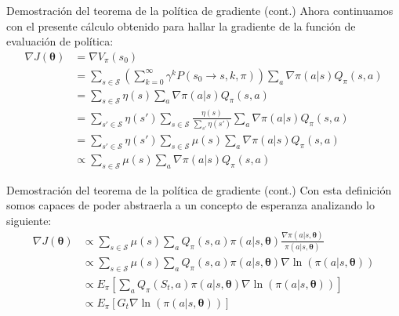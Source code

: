 \documentclass[10pt]{beamer}
\begin{document}
		\begin{frame}{Demostración del teorema de la política de gradiente (cont.)}
			Ahora continuamos con el presente cálculo obtenido para hallar la gradiente de la función de evaluación de política:
			\[
			\begin{aligned}
				\nabla J (\boldsymbol{\theta}) &= \nabla V_\pi(s_0) \\
				&= \sum_{s \in \mathcal{S}} \left(\sum_{k=0}^\infty \gamma^k P(s_0 \rightarrow s, k, \pi)\right) \sum_{a} \nabla \pi(a | s) Q_\pi (s, a) \\
				&= \sum_{s \in \mathcal{S}} \eta(s) \sum_a \nabla \pi(a | s) Q_\pi(s, a) \\
				&= \sum_{s' \in \mathcal{S}} \eta(s') \sum_{s \in \mathcal{S}} \frac{\eta(s)}{\sum_{s'}\eta(s')} \sum_a \nabla \pi(a | s) Q_\pi(s, a) \\
				&= \sum_{s' \in \mathcal{S}} \eta(s') \sum_{s \in \mathcal{S}} \mu(s) \sum_a \nabla \pi(a | s) Q_\pi(s, a) \\
				&\propto \sum_{s \in \mathcal{S}} \mu(s) \sum_a \nabla \pi(a | s) Q_\pi(s, a) 
			\end{aligned}
			\]
		\end{frame}

		\begin{frame}{Demostración del teorema de la política de gradiente (cont.)}
			Con esta definición somos capaces de poder abstraerla a un concepto de esperanza analizando lo siguiente:
			\[
			\begin{aligned}
				\nabla J(\boldsymbol{\theta}) &\propto \sum_{s \in \mathcal{S}} \mu(s) \sum_a Q_\pi(s, a) \pi(a | s, \boldsymbol{\theta}) \frac{\nabla \pi(a | s, \boldsymbol{\theta})}{\pi(a | s, \boldsymbol{\theta})} \\
				&\propto \sum_{s \in \mathcal{S}} \mu(s) \sum_a Q_\pi(s, a) \pi(a | s, \boldsymbol{\theta}) \nabla \ln(\pi(a | s, \boldsymbol{\theta})) \\
				&\propto E_\pi \left[\sum_a Q_\pi (S_t, a) \pi(a | s, \boldsymbol{\theta}) \nabla \ln(\pi(a | s, \boldsymbol{\theta}))\right] \\
				&\propto E_\pi \left[G_t \nabla \ln(\pi(a | s, \boldsymbol{\theta}))\right]
			\end{aligned}
			\]
		\end{frame}
	
\end{document}
